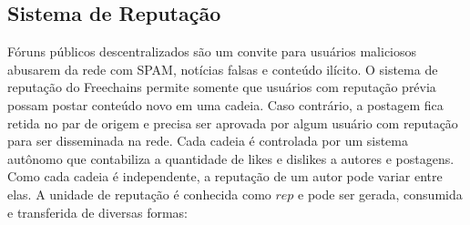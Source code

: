\documentclass[12pt]{article}
\newcommand{\FC} {Freechains\xspace}
\begin{document}
\subsection{Sistema de Reputação}

Fóruns públicos descentralizados são um convite para usuários maliciosos
abusarem da rede com SPAM, notícias falsas e conteúdo ilícito.
O sistema de reputação do \FC permite somente que usuários com reputação prévia
possam postar conteúdo novo em uma cadeia.
Caso contrário, a postagem fica retida no par de origem e precisa ser aprovada
por algum usuário com reputação para ser disseminada na rede.
Cada cadeia é controlada por um sistema autônomo que contabiliza a quantidade
de likes e dislikes a autores e postagens.
Como cada cadeia é independente, a reputação de um autor pode variar entre
elas.
A unidade de reputação é conhecida como $rep$ e pode ser gerada, consumida e
transferida de diversas formas:
%
\end{document}
